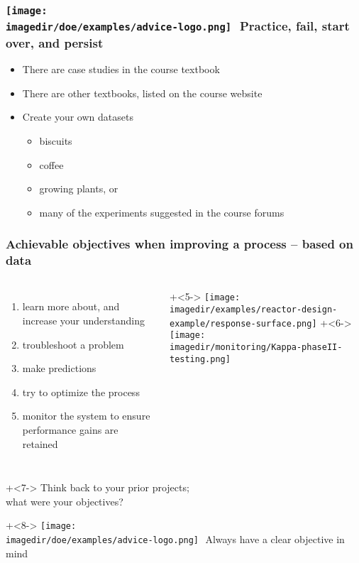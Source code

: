 \begin{frame}\frametitle{\texttt{[image: \\imagedir/doe/examples/advice-logo.png]}\,\, Practice, fail, start over, and persist}

	\begin{itemize}
		\item	There are case studies in the course textbook
		\item	There are other textbooks, listed on the course website
		\item	Create your own datasets
			\begin{itemize}
				\item	biscuits
				\item	coffee
				\item	growing plants, or
				\item	many of the experiments suggested in the course forums
				
			\end{itemize}
	\end{itemize}
\end{frame}






\begin{frame}\frametitle{Achievable objectives when improving a process -- based on data}
	\pause
	\begin{columns}[t]
			\begin{enumerate}
				\item	learn more about, and increase your understanding  \pause
				\item	troubleshoot a problem  \pause
				\item	make predictions  \pause
				\item	try to optimize the process  \pause
				\item	monitor the system to ensure performance gains are retained  \pause
			\end{enumerate}
	
			\onslide+<5->{
				\texttt{[image: \\imagedir/examples/reactor-design-example/response-surface.png]}
			}
			\onslide+<6->{
				\texttt{[image: \\imagedir/monitoring/Kappa-phaseII-testing.png]}
			}
			
	\end{columns}
	
	\vspace{-1cm}
	\onslide+<7->{
		Think back to your prior projects; \\what were your objectives?
	}

	\vspace{1cm}
	\onslide+<8->{
		\hfill \texttt{[image: \\imagedir/doe/examples/advice-logo.png]}
		\,\,{\color{blue}Always have a clear objective in mind}
	}
\end{frame}

